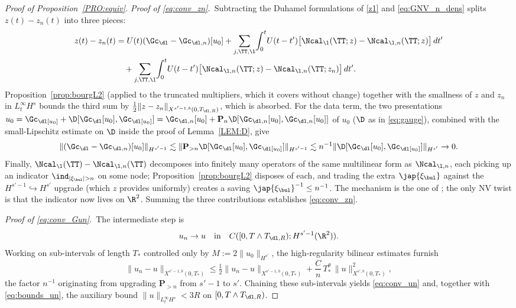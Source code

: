 \begin{proof}[Proof of Proposition~\textup{\ref{PRO:equiv}}]
\smallskip
\noindent\emph{Proof of \eqref{eq:conv_zn}.}\
Subtracting the Duhamel formulations of \eqref{z1} and
\eqref{eq:GNV_n_dens} splits $z(t)-z_n(t)$ into three pieces:
\begin{align*}
z(t)-z_n(t)
&= U(t)(\Gc_\dl-\Gc_{\dl,n})[u_0]
+ \sum_{j,\TT,\l}\!\int_0^t\! U(t-t')
\big[\Ncal_\l(\TT;z)-\Ncal_{\l,n}(\TT;z)\big]\,dt'
\\
&\quad
+ \sum_{j,\TT,\l}\!\int_0^t\! U(t-t')
\big[\Ncal_{\l,n}(\TT;z)-\Ncal_{\l,n}(\TT;z_n)\big]\,dt'.
\end{align*}
Proposition~\ref{prop:bourgL2} (applied to the truncated multipliers,
which it covers without change) together with the smallness of $z$
and $z_n$ in $L^\infty_t H^s$ bounds the third sum by
$\tfrac12\|z-z_n\|_{X^{s'-1,b}(0,T_{\dl,R})}$, which is absorbed.
For the data term, the two presentations
$u_0=\Gc_\dl[u_0]+\D[\Gc_\dl[u_0],\Gc_\dl[u_0]]
=\Gc_{\dl,n}[u_0]+\mathbf{P}_n\D[\Gc_{\dl,n}[u_0],\Gc_{\dl,n}[u_0]]$
of $u_0$ ($\D$ as in \eqref{eq:gauge}), combined with the
small-Lipschitz estimate on $\D$ inside the proof of
Lemma~\ref{LEM:D}, give
\[
\|(\Gc_\dl-\Gc_{\dl,n})[u_0]\|_{H^{s'-1}}
\lesssim \|\mathbf{P}_{>n}\D[\Gc_\dl[u_0],\Gc_\dl[u_0]]\|_{H^{s'-1}}
\lesssim n^{-1}\|\D[\Gc_\dl[u_0],\Gc_\dl[u_0]]\|_{H^{s'}}
\to 0.
\]
Finally, $\Ncal_\l(\TT)-\Ncal_{\l,n}(\TT)$ decomposes into finitely
many operators of the same multilinear form as $\Ncal_{\l,n}$,
each picking up an indicator $\ind_{|\xi_\bul|>n}$ on some node;
Proposition~\ref{prop:bourgL2} disposes of each, and trading the
extra $\jap{\xi_\bul}$ against the $H^{s'-1}\hookrightarrow H^{s'}$
upgrade (which $z$ provides uniformly) creates a saving
$\jap{\xi_\bul}^{-1}\le n^{-1}$. The mechanism is the one of
\cite{chcora}; the only NV twist is that the indicator now lives on
$\R^2$. Summing the three contributions establishes
\eqref{eq:conv_zn}.

\smallskip
\noindent\emph{Proof of \eqref{eq:conv_Gun}.}\
The intermediate step is
\begin{equation}\label{eq:conv_un}
u_n \to u \quad\text{in}\quad C([0,T\wedge T_{\dl,R}); H^{s'-1}(\R^2)).
\end{equation}
Working on sub-intervals of length $T_*$ controlled only by
$M:=2\|u_0\|_{H^{s'}}$, the high-regularity bilinear estimates
\cite{angelopolous,kazeykinamunoz1,kazeykinamunoz2} furnish
\[
\|u_n-u\|_{X^{s'-1,b}(0,T_*)}
\le \tfrac12\|u_n-u\|_{X^{s'-1,b}(0,T_*)}
+ \frac{C}{n}\,T_*^\theta\,\|u\|_{X^{s',b}(0,T_*)}^2,
\]
the factor $n^{-1}$ originating from upgrading $\mathbf{P}_{>n}$ from
$s'-1$ to $s'$. Chaining these sub-intervals yields
\eqref{eq:conv_un} and, together with \eqref{eq:bounds_un}, the
auxiliary bound $\|u\|_{L^\infty_t H^s}<3R$ on
$[0,T\wedge T_{\dl,R})$.


\end{proof}
